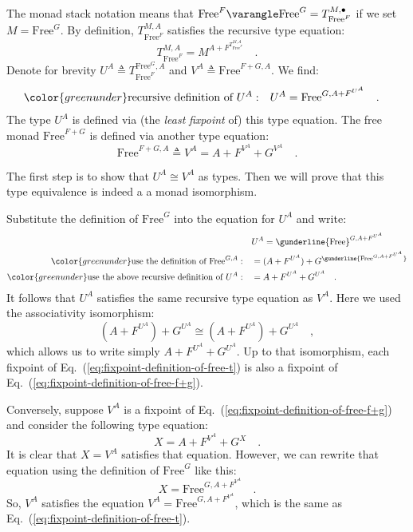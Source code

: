 The monad stack notation means that $\text{Free}^{F}\varangle\text{Free}^{G}=T_{\text{Free}^{F}}^{M,\bullet}$
if we set $M=\text{Free}^{G}$. By definition, $T_{\text{Free}^{F}}^{M,A}$
satisfies the recursive type equation:
\[
T_{\text{Free}^{F}}^{M,A}=M^{A+F^{T_{\text{Free}^{F}}^{M,A}}}\quad.
\]
Denote for brevity $U^{A}\triangleq T_{\text{Free}^{F}}^{\text{Free}^{G},A}$
and $V^{A}\triangleq\text{Free}^{F+G,A}$. We find:
\begin{align}
{\color{greenunder}\text{recursive definition of }U^{A}:}\quad & U^{A}=\text{Free}^{G,A+F^{U^{A}}}\quad.\label{eq:fixpoint-definition-of-free-t}
\end{align}
The type $U^{A}$ is defined via (the \emph{least} \emph{fixpoint}
of) this type equation. The free monad $\text{Free}^{F+G}$ is defined
via another type equation:
\begin{equation}
\text{Free}^{F+G,A}\triangleq V^{A}=A+F^{V^{A}}+G^{V^{A}}\quad.\label{eq:fixpoint-definition-of-free-f+g}
\end{equation}

The first step is to show that $U^{A}\cong V^{A}$ as types. Then
we will prove that this type equivalence is indeed a a monad isomorphism. 

Substitute the definition of $\text{Free}^{G}$ into the equation
for $U^{A}$ and write:
\begin{align*}
 & U^{A}=\gunderline{\text{Free}}^{G,A+F^{U^{A}}}\\
{\color{greenunder}\text{use the definition of }\text{Free}^{G,A}:}\quad & =(A+F^{U^{A}})+G^{\gunderline{\text{Free}^{G,A+F^{U^{A}}}}}\\
{\color{greenunder}\text{use the above recursive definition of }U^{A}:}\quad & =A+F^{U^{A}}+G^{U^{A}}\quad.
\end{align*}
It follows that $U^{A}$ satisfies the same recursive type equation
as $V^{A}$. Here we used the associativity isomorphism:
\[
(A+F^{U^{A}})+G^{U^{A}}\cong(A+F^{U^{A}})+G^{U^{A}}\quad,
\]
which allows us to write simply $A+F^{U^{A}}+G^{U^{A}}$. Up to that
isomorphism, each fixpoint of Eq.~(\ref{eq:fixpoint-definition-of-free-t})
is also a fixpoint of Eq.~(\ref{eq:fixpoint-definition-of-free-f+g}).

Conversely, suppose $V^{A}$ is a fixpoint of Eq.~(\ref{eq:fixpoint-definition-of-free-f+g})
and consider the following type equation:
\[
X=A+F^{V^{A}}+G^{X}\quad.
\]
It is clear that $X=V^{A}$ satisfies that equation. However, we can
rewrite that equation using the definition of $\text{Free}^{G}$ like
this:
\[
X=\text{Free}^{G,A+F^{V^{A}}}\quad.
\]
So, $V^{A}$ satisfies the equation $V^{A}=\text{Free}^{G,A+F^{V^{A}}}$,
which is the same as Eq.~(\ref{eq:fixpoint-definition-of-free-t}).

